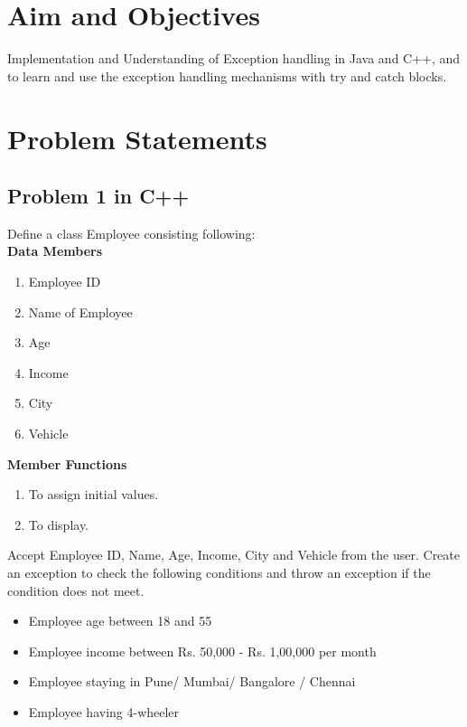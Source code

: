 \documentclass[11pt]{article}
\begin{document}
\tableofcontents
\thispagestyle{empty}
\clearpage


\setcounter{page}{1}

\section{Aim and Objectives}
Implementation and Understanding of Exception handling in Java and C++, and to learn and use the exception handling mechanisms with try and catch blocks.

\section{Problem Statements}


\subsection{Problem 1 in C++}
Define a class Employee consisting following:\\
\textbf{Data Members}\\
\begin{enumerate}
	\item Employee ID
	\item Name of Employee
	\item Age
	\item Income
	\item City
	\item Vehicle
\end{enumerate}
\textbf{Member Functions}\\
\begin{enumerate}
	\item To assign initial values.
	\item To display.
\end{enumerate}
Accept Employee ID, Name, Age, Income, City and Vehicle from the user. Create
an exception to check the following conditions and throw an exception if the
condition does not meet.

\begin{itemize}
	\item Employee age between 18 and 55
	\item Employee income between Rs. 50,000 - Rs. 1,00,000 per month
	\item Employee staying in Pune/ Mumbai/ Bangalore / Chennai
	\item Employee having 4-wheeler
\end{itemize}
\end{document}
